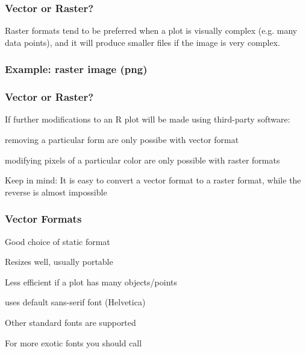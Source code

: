 \documentclass[12pt]{beamer}\usepackage[]{graphicx}\usepackage[]{color}
\begin{document}

\begin{frame}
\frametitle{Vector or Raster?}

Raster formats tend to be preferred when a plot is visually complex (e.g. many data points), and it will produce smaller files if the image is very complex.
\eb

\end{frame}


\begin{frame}
\frametitle{Example: raster image (png)}
\begin{center}
\end{center}
\end{frame}


\begin{frame}
\frametitle{Vector or Raster?}

If further modifications to an R plot will be made using third-party software:
\bi
  \item removing a particular form are only possibe with vector format
  \item modifying pixels of a particular color are only possible with raster formats
\ei

{\lit Keep in mind: It is easy to convert a vector format to a raster format, while the reverse is almost impossible}
\end{frame}


\begin{frame}
\frametitle{Vector Formats}

\bi
  \item Good choice of static format
  \item Resizes well, usually portable
  \item Less efficient if a plot has many objects/points
  \item {} uses default sans-serif font (Helvetica)
  \item Other standard fonts are supported
  \item For more exotic fonts you should call 
\ei
\eb

\end{frame}
\end{document}

